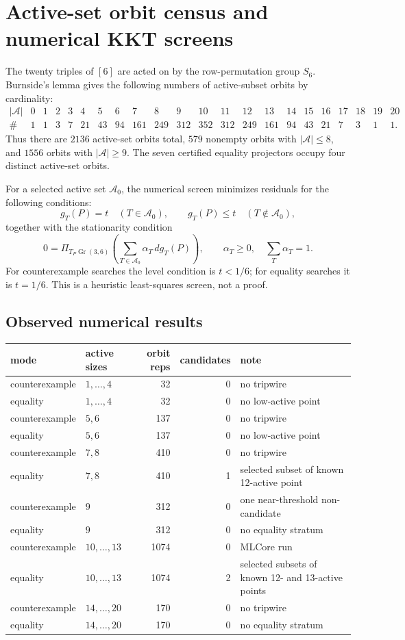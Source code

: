 \documentclass[11pt]{article}
\numberwithin{equation}{section}
\theoremstyle{definition}
\newcommand{\Gr}{\operatorname{Gr}}
\newcommand{\cA}{\mathcal A}
\begin{document}
\section{Active-set orbit census and numerical KKT screens}

The twenty triples of $[6]$ are acted on by the row-permutation group $S_6$.
Burnside's lemma gives the following numbers of active-subset orbits by
cardinality:
{\scriptsize
\[
\begin{array}{c|rrrrrrrrrrrrrrrrrrrrr}
|\cA|&0&1&2&3&4&5&6&7&8&9&10&11&12&13&14&15&16&17&18&19&20\\
\hline
\#&1&1&3&7&21&43&94&161&249&312&352&312&249&161&94&43&21&7&3&1&1.
\end{array}
\]
}
Thus there are $2136$ active-set orbits total, $579$ nonempty orbits with
$|\cA|\le8$, and $1556$ orbits with $|\cA|\ge9$.  The seven certified equality
projectors occupy four distinct active-set orbits.

For a selected active set $\cA_0$, the numerical screen minimizes residuals for
the following conditions:
\[
  g_T(P)=t\quad(T\in\cA_0),\qquad
  g_T(P)\le t\quad(T\notin\cA_0),
\]
together with the stationarity condition
\[
  0=\Pi_{T_P\Gr(3,6)}\left(\sum_{T\in\cA_0}\alpha_T\,dg_T(P)\right),
  \qquad \alpha_T\ge0,\quad \sum_T\alpha_T=1.
\]
For counterexample searches the level condition is $t<1/6$; for equality
searches it is $t=1/6$.  This is a heuristic least-squares screen, not a proof.

\subsection*{Observed numerical results}

\begin{center}
\footnotesize
\begin{tabular}{llrrp{2.5in}}
\hline
mode & active sizes & orbit reps & candidates & note\\
\hline
counterexample & $1,\ldots,4$ & 32 & 0 & no tripwire\\
equality & $1,\ldots,4$ & 32 & 0 & no low-active point\\
counterexample & $5,6$ & 137 & 0 & no tripwire\\
equality & $5,6$ & 137 & 0 & no low-active point\\
counterexample & $7,8$ & 410 & 0 & no tripwire\\
equality & $7,8$ & 410 & 1 & selected subset of known 12-active point\\
counterexample & $9$ & 312 & 0 & one near-threshold non-candidate\\
equality & $9$ & 312 & 0 & no equality stratum\\
counterexample & $10,\ldots,13$ & 1074 & 0 & MLCore run\\
equality & $10,\ldots,13$ & 1074 & 2 & selected subsets of known 12- and 13-active points\\
counterexample & $14,\ldots,20$ & 170 & 0 & no tripwire\\
equality & $14,\ldots,20$ & 170 & 0 & no equality stratum\\
\hline
\end{tabular}
\end{center}
\end{document}
